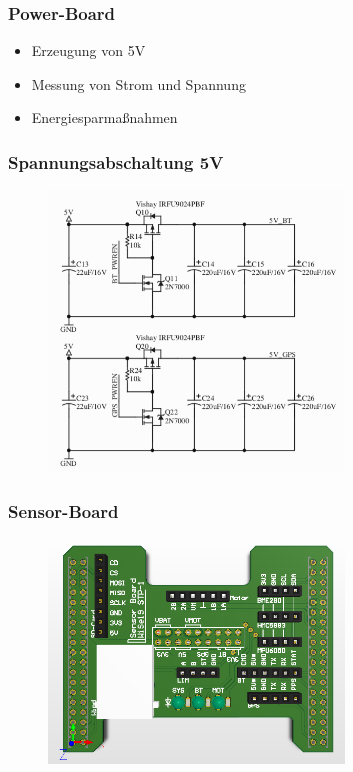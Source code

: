\documentclass{beamer}
\begin{document}
\begin{frame}
\frametitle{Power-Board}
\begin{itemize}
\item Erzeugung von 5V
\item Messung von Strom und Spannung
\item Energiesparmaßnahmen
\end{itemize}

\end{frame}

\begin{frame}
\frametitle{Spannungsabschaltung 5V}
\begin{figure}[H]
\centering
\includegraphics[width=0.7\textwidth]{./img/spannungsabschaltung.png}
\end{figure}

\end{frame}


\begin{frame}
\frametitle{Sensor-Board}
\begin{figure}[H]
\centering
\includegraphics[width=0.7\textwidth]{./img/PCB_Sensors_3D_top.PNG}
\end{figure}
\end{frame}
\end{document}
